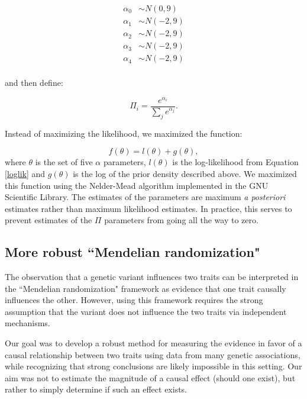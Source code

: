 \documentclass[11pt,titlepage]{article}
\begin{document}
\begin{align}
\alpha_0 &\sim N(0, 9) \\
\alpha_1 &\sim N(-2, 9)\\
\alpha_2 &\sim N(-2, 9)\\
\alpha_3 &\sim N(-2, 9)\\
\alpha_4 &\sim N(-2, 9)\\
\end{align}

\noindent and then define:

\begin{equation} 
\Pi_i = \frac{e^{\alpha_i}}{\sum_j e^{\alpha_j}}.
\end{equation}

Instead of maximizing the likelihood, we maximized the function:

\begin{equation}
f(\theta) = l(\theta) + g(\theta),
\end{equation}
where $\theta$ is the set of five $\alpha$ parameters, $l(\theta)$ is the log-likelihood from Equation \ref{loglik} and $g(\theta)$ is the log of the prior density described above. We maximized this function using the Nelder-Mead algorithm implemented in the GNU Scientific Library. The estimates of the parameters are maximum \emph{a posteriori} estimates rather than maximum likelihood estimates. In practice, this serves to prevent estimates of the $\Pi$ parameters from going all the way to zero. 


\subsection{More robust ``Mendelian randomization"}
The observation that a genetic variant influences two traits can be interpreted in the ``Mendelian randomization" framework as evidence that one trait causally influences the other. However, using this framework requires the strong assumption that the variant does not influence the two traits via independent mechanisms. 

Our goal was to develop a robust method for measuring the evidence in favor of a causal relationship between two traits using data from many genetic associations, while recognizing that strong conclusions are likely impossible in this setting. Our aim was not to estimate the magnitude of a causal effect (should one exist), but rather to simply determine if such an effect exists. 
\end{document}
